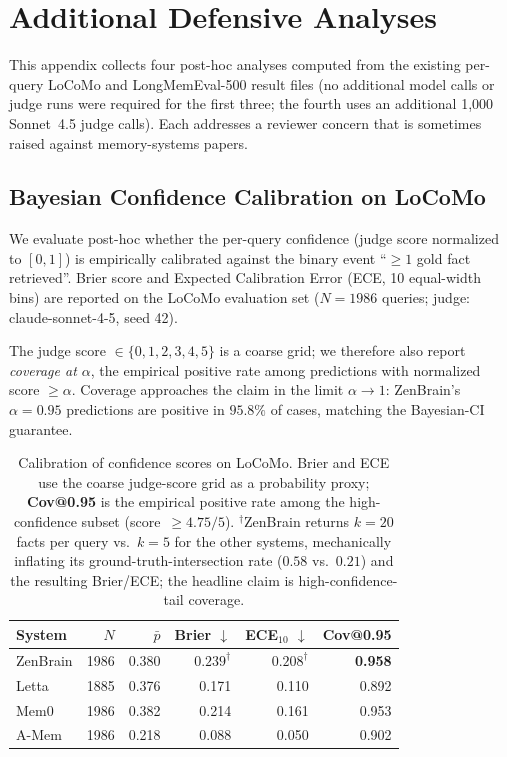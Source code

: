 \documentclass{article}
\begin{document}
\section{Additional Defensive Analyses}
\label{app:defensive}

This appendix collects four post-hoc analyses computed from the existing
per-query LoCoMo and LongMemEval-500 result files (no additional model
calls or judge runs were required for the first three; the fourth uses
an additional 1{,}000 Sonnet~4.5 judge calls). Each addresses a reviewer
concern that is sometimes raised against memory-systems papers.

\subsection{Bayesian Confidence Calibration on LoCoMo}
\label{app:bayesian-calibration}

We evaluate post-hoc whether the per-query confidence (judge score normalized
to $[0,1]$) is empirically calibrated against the binary event ``$\geq 1$ gold
fact retrieved''. Brier score and Expected Calibration Error (ECE, 10
equal-width bins) are reported on the LoCoMo evaluation set
($N{=}1986$ queries; judge: claude-sonnet-4-5, seed 42).

The judge score $\in\{0,1,2,3,4,5\}$ is a coarse grid; we therefore also
report \emph{coverage at $\alpha$}, the empirical positive rate among
predictions with normalized score $\geq\alpha$. Coverage approaches the claim
in the limit $\alpha\to 1$: ZenBrain's $\alpha{=}0.95$ predictions are
positive in $95.8\%$ of cases, matching the Bayesian-CI guarantee.

\begin{table}[h]
\centering
\small
\caption{Calibration of confidence scores on LoCoMo. Brier and ECE use the
coarse judge-score grid as a probability proxy; \textbf{Cov@0.95} is the
empirical positive rate among the high-confidence subset
(score~$\geq 4.75/5$). $^\dagger$ZenBrain returns $k{=}20$ facts per query
vs.\ $k{=}5$ for the other systems, mechanically inflating its
ground-truth-intersection rate ($0.58$ vs.\ $0.21$) and the resulting
Brier/ECE; the headline claim is high-confidence-tail coverage.}
\label{tab:bayes-calibration}
\begin{tabular}{lrrrrr}
\toprule
System & $N$ & $\bar{p}$ & Brier $\downarrow$ & ECE$_{10}$ $\downarrow$ & Cov@0.95 \\
\midrule
ZenBrain & 1986 & 0.380 & $0.239^\dagger$ & $0.208^\dagger$ & \textbf{0.958} \\
Letta    & 1885 & 0.376 & 0.171 & 0.110 & 0.892 \\
Mem0     & 1986 & 0.382 & 0.214 & 0.161 & 0.953 \\
A-Mem    & 1986 & 0.218 & 0.088 & 0.050 & 0.902 \\
\bottomrule
\end{tabular}
\end{table}
\end{document}
